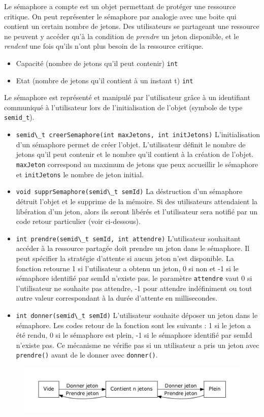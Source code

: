 {
Le sémaphore a compte est un objet permettant de protéger une ressource
critique. On peut représenter le sémaphore par analogie avec une boite qui
contient un certain nombre de jetons. Des utilisateurs se partageant une
ressource ne peuvent y accéder qu'à la condition de \emph{prendre} un jeton
disponible, et le \emph{rendent} une fois qu'ils n'ont plus besoin de la
ressource critique.
}
{
\begin{itemize}
	\item Capacité (nombre de jetons qu'il peut contenir) \lstinline{int}
	\item Etat (nombre de jetons qu'il contient à un instant t) \lstinline{int}
\end{itemize}

Le sémaphore est représenté et manipulé par l'utilisateur grâce à un
identifiant communiqué à l'utilisateur lors de l'initialisation de l'objet
(symbole de type \texttt{semid\_t}).
}
{
\begin{itemize}
	\item \lstinline{semid\_t creerSemaphore(int maxJetons, int initJetons)}
L'initialisation d'un sémaphore permet de créer l'objet. L'utilisateur définit
le nombre de jetons qu'il peut contenir et le nombre qu'il contient à la
création de l'objet. \texttt{maxJeton} correspond au maximum de jetons que peux
accueillir le sémaphore et \texttt{initJetons} le nombre de jeton initial.
	\item \lstinline{void supprSemaphore(semid\_t semId)} La déstruction d'un
sémaphore détruit l'objet et le supprime de la mémoire. Si des utilisateurs
attendaient la libération d'un jeton, alors ils seront libérés et l'utilisateur
sera notifié par un code retour particulier (voir ci-dessous).
	\item \lstinline{int prendre(semid\_t semId, int attendre)} L'utilisateur
souhaitant accéder à la ressource partagée doit prendre un jeton dans le
sémaphore. Il peut spécifier la stratégie d'attente si aucun jeton n'est
disponible. La fonction retourne 1 si l'utilisateur a obtenu un jeton, 0 si non
et -1 si le sémaphore identifié par semId n'existe pas. le paramètre
\texttt{attendre} vaut 0 si l'utilisateur ne souhaite pas attendre, -1 pour
attendre indéfiniment ou tout autre valeur correspondant à la durée d'attente
en millisecondes.
	\item \lstinline{int donner(semid\_t semId)} L'utilisateur souhaite
déposer un jeton dans le sémaphore. Les codes retour de la fonction sont les
suivants : 1 si le jeton a été rendu, 0 si le sémaphore est plein, -1 si le
sémaphore identifié par semId n'existe pas. Ce mécanisme ne vérifie pas si un
utilisateur a pris un jeton avec \texttt{prendre()} avant de le donner avec
\texttt{donner()}.
\end{itemize}
}
{
\begin{figure} [htp]
\centering
\includegraphics[width=\textwidth]{img/etatSemaphoreACompte.pdf}
\end{figure}
}
{
}
